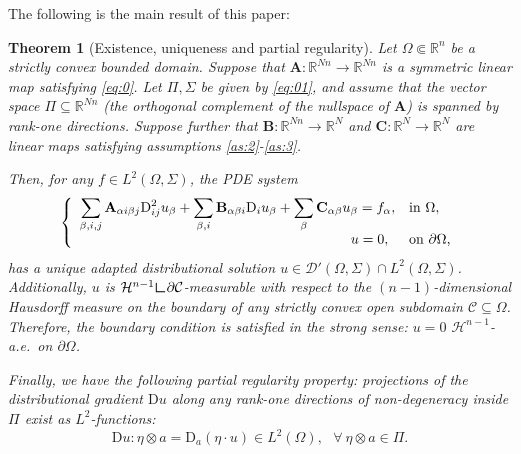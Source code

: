 \documentclass{amsart}
\numberwithin{equation}{section}
\newtheorem{thm}{Theorem}
\numberwithin{thm}{section}
\theoremstyle{definition}
\def\D{\mathrm{D}}
\def\Om{\Omega}
\def\p{\mathrm{p}}
\newcommand{\mC}{\mathcal{C}}
\newcommand{\mH}{\mathcal{H}}
\newcommand{\mD}{\mathcal{D}}
\renewcommand{\:}{\!:\!} %
\newcommand{\Si}{\Sigma}
\newcommand{\ot}{\otimes}
\newcommand{\LL}{\text{\LARGE$\llcorner$}}
\renewcommand{\p}{\partial}
\newcommand{\sub}{\subseteq}
\renewcommand{\^}[1]{^{#1}_{\phantom{l}}}
\begin{document}
\medskip

The following is the main result of this paper:

\begin{thm}[Existence, uniqueness and partial regularity] \label{thm:1}
Let $\Omega \Subset \mathbb{R}^{n}$ be a strictly convex bounded domain. Suppose that  $\mathbf{A} : \mathbb{R}^{Nn} \longrightarrow \mathbb{R}^{Nn}$ is a symmetric linear map satisfying \eqref{eq:0}. Let $\Pi,\Si$ be given by \eqref{eq:01}, and assume that the vector space $\Pi \subseteq \mathbb{R}^{Nn}$ (the orthogonal complement of the nullspace of $\mathbf{A}$) is spanned by rank-one directions. Suppose further that $\mathbf{B}: \mathbb{R}^{Nn} \longrightarrow \mathbb{R}^{N}$ and $\mathbf{C}: \mathbb{R}^{N} \longrightarrow \mathbb{R}^{N}$ are linear maps satisfying assumptions \eqref{as:2}-\eqref{as:3}. 

Then, for any $f \in L^2(\Omega, \Sigma)$, the PDE system
\[ 
\left\{
\begin{array}{rl} 
			\hfil \displaystyle\sum_{\beta, i, j} \mathbf{A}_{\alpha i \beta j}\mathrm{D}_{ij}^{2}u_{\beta} + \sum_{\beta, i} \mathbf{B}_{\alpha \beta i}\mathrm{D}_{i}u_{\beta} + \sum_{\beta} \mathbf{C}_{\alpha \beta}u_{\beta} = f_{\alpha}, &\text{in $\Omega$}, 
			\\
            u = 0,\ \,  & \text{on $\partial \Omega$,}
\end{array}
\right.
\]
has a unique adapted distributional solution $u \in\mD'(\Om,\Si) \cap L^2(\Omega, \Sigma)$.  Additionally, $u$ is $\mH^{n-1}\LL \p \mC$-measurable with respect to the $(n-1)$-dimensional Hausdorff measure on the boundary of any strictly convex open subdomain $\mC \sub \Om$. Therefore, the boundary condition is satisfied in the strong sense: $u=0$ $\mH^{n-1}$-a.e.\ on $\p\Om$. 

Finally, we have the following partial regularity property: projections of the distributional gradient $\D u$ along any rank-one directions of non-degeneracy inside $\Pi$ exist as $L^2$-functions: 
\[
\D u : \eta\ot a = \D_a(\eta \cdot u) \in L^2(\Om), \ \ \ \forall\ \eta \ot a \in \Pi.
\]
\end{thm}
\end{document}
